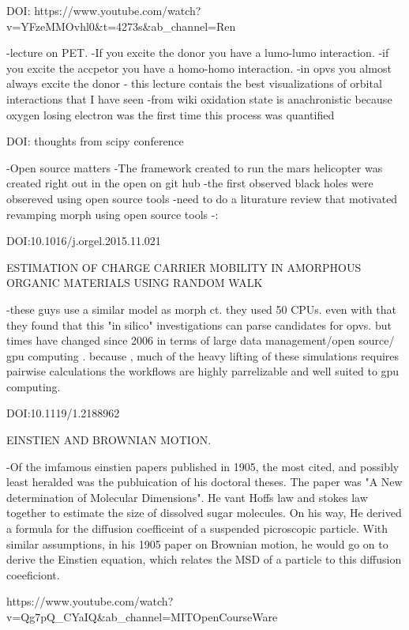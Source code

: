 DOI: https://www.youtube.com/watch?v=YFzeMMOvhl0&t=4273s&ab_channel=Ren%


    -lecture on PET. 
    -If you excite the donor you have a lumo-lumo interaction.
    -if you excite the accpetor you have a homo-homo interaction.
    -in opvs you almost always excite the donor
    - this lecture contais the best visualizations of orbital interactions that I have seen
    -from wiki oxidation state is anachronistic because oxygen losing electron was the first time
    this process was quantified


DOI: thoughts from scipy conference

    -Open source matters
    -The framework created to run the mars helicopter was created right out in the open on git hub
    -the first observed black holes were obsereved using open source tools
    -need to do a liturature review that motivated revamping morph using open source tools
    -:


DOI:10.1016/j.orgel.2015.11.021
    
    ESTIMATION OF CHARGE CARRIER MOBILITY IN AMORPHOUS ORGANIC MATERIALS USING RANDOM WALK


        -these guys use a similar model as morph ct. they used 50 CPUs. even with that they found
        that this "in silico" investigations can parse candidates for opvs. but times have changed since 
        2006 in terms of large data management/open source/ gpu computing . because , much of the heavy lifting
        of these simulations requires pairwise calculations the workflows are highly parrelizable and well
        suited to gpu computing.


DOI:10.1119/1.2188962

    EINSTIEN AND BROWNIAN MOTION. 

    -Of the imfamous einstien papers published in 1905, the most cited, and possibly least heralded was the 
    publuication of his doctoral theses. The paper was "A New determination of Molecular Dimensions". He 
    vant Hoffs law and stokes law together to estimate the size of dissolved sugar molecules. On his way, He 
    derived a formula for the diffusion coefficeint of a suspended picroscopic particle. With similar assumptions, 
    in his 1905 paper on Brownian motion, he would go on to derive the Einstien equation, which relates the
    MSD of a particle to this diffusion coeeficiont. 

https://www.youtube.com/watch?v=Qg7pQ_CYaIQ&ab_channel=MITOpenCourseWare

